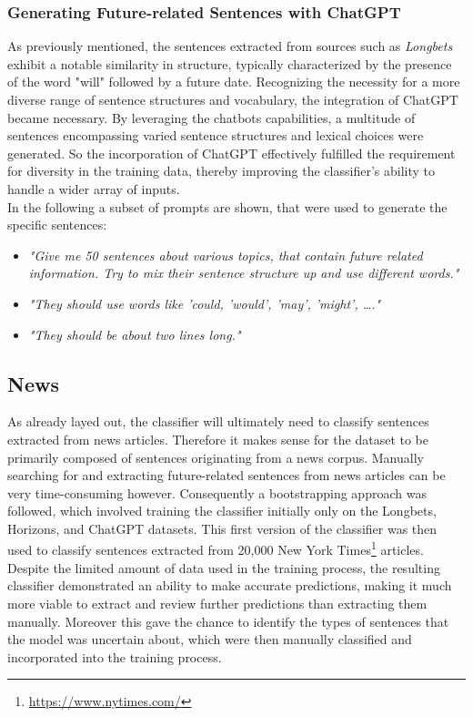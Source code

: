 \documentclass[a4paper,10pt]{report} %
\begin{document}
\subsubsection{Generating Future-related Sentences with ChatGPT}
As previously mentioned, the sentences extracted from sources such as \textit{Longbets} exhibit a notable similarity in structure, typically characterized by the presence of the word "will" followed by a future date. Recognizing the necessity for a more diverse range of sentence structures and vocabulary, the integration of ChatGPT became necessary. By leveraging the chatbots capabilities, a multitude of sentences encompassing varied sentence structures and lexical choices were generated. So the incorporation of ChatGPT effectively fulfilled the requirement for diversity in the training data, thereby improving the classifier's ability to handle a wider array of inputs. \\

In the following a subset of prompts are shown, that were used to generate the specific sentences:
\begin{itemize}
  \item \textit{"Give me 50 sentences about various topics, that contain future related information. Try to mix their sentence structure up and use different words."}
  \item \textit{"They should use words like 'could, 'would', 'may', 'might', …."}
  \item \textit{"They should be about two lines long."}
\end{itemize}

\subsection{News}
As already layed out, the classifier will ultimately need to classify sentences extracted from news articles. Therefore it makes sense for the dataset to be primarily composed of sentences originating from a news corpus. Manually searching for and extracting future-related sentences from news articles can be very time-consuming however. Consequently a bootstrapping approach was followed, which involved training the classifier initially only on the Longbets, Horizons, and ChatGPT datasets. This first version of the classifier was then used to classify sentences extracted from 20,000 New York Times\footnote{\url{https://www.nytimes.com/}} articles.
Despite the limited amount of data used in the training process, the resulting classifier demonstrated an ability to make accurate predictions, making it much more viable to extract and review further predictions than extracting them manually. Moreover this gave the chance to identify the types of sentences that the model was uncertain about, which were then manually classified and incorporated into the training process.
\end{document}
